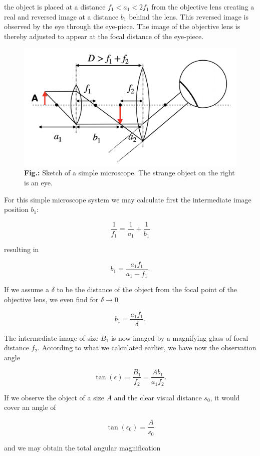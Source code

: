 \documentclass[
  a4paper,
]{book}
\begin{document}
the object is placed at a distance \(f_1< a_1<2f_1\) from the objective
lens creating a real and reversed image at a distance \(b_1\) behind the
lens. This reversed image is observed by the eye through the eye-piece.
The image of the objective lens is thereby adjusted to appear at the
focal distance of the eye-piece.

\begin{figure}[H]

{\centering \includegraphics[width=0.6\linewidth,height=\textheight,keepaspectratio]{geometrical-optics/img/simple_microscope.png}

}

\caption{\textbf{Fig.:} Sketch of a simple microscope. The strange
object on the right is an eye.}

\end{figure}%

For this simple microscope system we may calculate first the
intermediate image position \(b_1\):

\[
\frac{1}{f_1}=\frac{1}{a_1}+\frac{1}{b_1}
\]

resulting in

\[
b_1=\frac{a_1 f_1}{a_1-f_1}.
\]

If we assume a \(\delta\) to be the distance of the object from the
focal point of the objective lens, we even find for
\(\delta \rightarrow 0\)

\[
b_1=\frac{a_1 f_1}{\delta}.
\]

The intermediate image of size \(B_1\) is now imaged by a magnifying
glass of focal distance \(f_2\). According to what we calculated
earlier, we have now the observation angle

\[
\tan(\epsilon)=\frac{B_1}{f_2}=\frac{Ab_1}{a_1 f_2}.
\]

If we observe the object of a size \(A\) and the clear visual distance
\(s_0\), it would cover an angle of

\[
\tan(\epsilon_0)=\frac{A}{s_0}
\]

and we may obtain the total angular magnification
\end{document}
